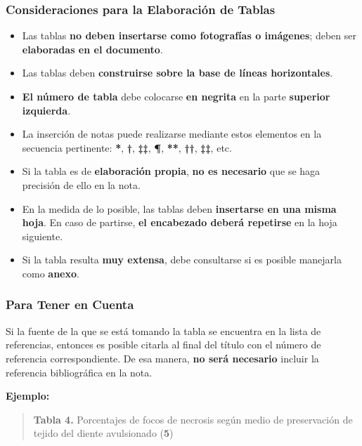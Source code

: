 \documentclass[
11pt, %
]{beamer}
\begin{document}
\begin{frame}
	\frametitle{Consideraciones para la Elaboración de Tablas}

	\begin{itemize}
		\item Las tablas \textbf{no deben insertarse como fotografías o imágenes}; deben ser \textbf{elaboradas en el documento}.
		\item Las tablas deben \textbf{construirse sobre la base de líneas horizontales}.
		\item \textbf{El número de tabla} debe colocarse \textbf{en negrita} en la parte \textbf{superior izquierda}.
		\item La inserción de notas puede realizarse mediante estos elementos en la secuencia pertinente: \textbf{*}, \textbf{†}, \textbf{‡‡}, \textbf{¶}, \textbf{**}, \textbf{††}, \textbf{‡‡}, etc.
		\item Si la tabla es de \textbf{elaboración propia}, \textbf{no es necesario} que se haga precisión de ello en la nota.
		\item En la medida de lo posible, las tablas deben \textbf{insertarse en una misma hoja}. En caso de partirse, \textbf{el encabezado deberá repetirse} en la hoja siguiente.
		\item Si la tabla resulta \textbf{muy extensa}, debe consultarse si es posible manejarla como \textbf{anexo}.
	\end{itemize}

\end{frame}

\begin{frame}
	\frametitle{Para Tener en Cuenta}

	Si la fuente de la que se está tomando la tabla se encuentra en la lista de referencias, entonces es posible citarla al final del título con el número de referencia correspondiente. De esa manera, \textbf{no será necesario} incluir la referencia bibliográfica en la nota.

	\textbf{Ejemplo:}

	\begin{quote}
		\textbf{Tabla 4.} Porcentajes de focos de necrosis según medio de preservación de tejido del diente avulsionado (\textbf{5})
	\end{quote}

\end{frame}
\end{document}
